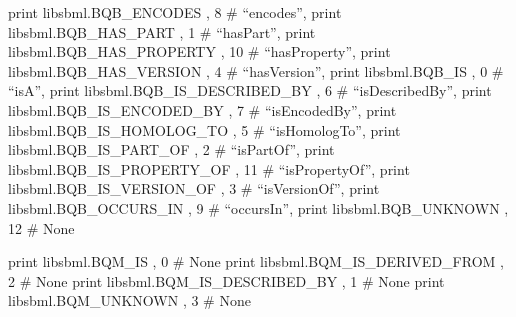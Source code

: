 \documentclass[a4paper,11pt,english]{sphinxmanual}
\begin{document}
\begin{fulllineitems}
\label{modules_doc:cbmpy.CBXML.SBML_NS}
print libsbml.BQB\_ENCODES            , 8  \# ``encodes'',
print libsbml.BQB\_HAS\_PART           , 1  \# ``hasPart'',
print libsbml.BQB\_HAS\_PROPERTY       , 10 \# ``hasProperty'',
print libsbml.BQB\_HAS\_VERSION        , 4  \# ``hasVersion'',
print libsbml.BQB\_IS                 , 0  \# ``isA'',
print libsbml.BQB\_IS\_DESCRIBED\_BY    , 6  \# ``isDescribedBy'',
print libsbml.BQB\_IS\_ENCODED\_BY      , 7  \# ``isEncodedBy'',
print libsbml.BQB\_IS\_HOMOLOG\_TO      , 5  \# ``isHomologTo'',
print libsbml.BQB\_IS\_PART\_OF         , 2  \# ``isPartOf'',
print libsbml.BQB\_IS\_PROPERTY\_OF     , 11 \# ``isPropertyOf'',
print libsbml.BQB\_IS\_VERSION\_OF      , 3  \# ``isVersionOf'',
print libsbml.BQB\_OCCURS\_IN          , 9  \# ``occursIn'',
print libsbml.BQB\_UNKNOWN            , 12 \# None

print libsbml.BQM\_IS                 , 0 \# None
print libsbml.BQM\_IS\_DERIVED\_FROM    , 2 \# None
print libsbml.BQM\_IS\_DESCRIBED\_BY    , 1 \# None
print libsbml.BQM\_UNKNOWN            , 3 \# None

\end{fulllineitems}

\end{document}
